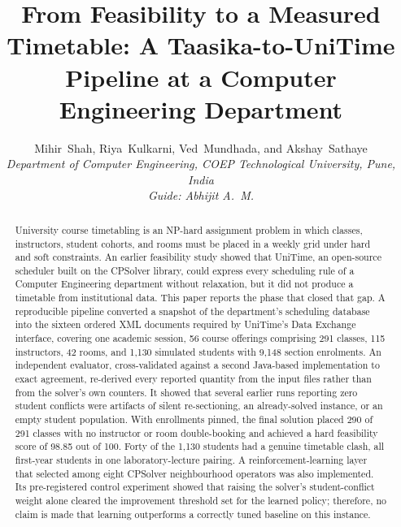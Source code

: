 \documentclass[journal]{IEEEtran}
\begin{document}
\title{From Feasibility to a Measured Timetable: A Taasika-to-UniTime Pipeline at a Computer Engineering Department}

\author{Mihir~Shah, Riya~Kulkarni, Ved~Mundhada, and Akshay~Sathaye\\
\textit{Department of Computer Engineering, COEP Technological University, Pune, India}\\
\textit{Guide: Abhijit A.\ M.}}


\maketitle

\begin{abstract}
University course timetabling is an NP-hard assignment problem in which classes, instructors, student cohorts, and rooms must be placed in a weekly grid under hard and soft constraints. An earlier feasibility study showed that UniTime, an open-source scheduler built on the CPSolver library, could express every scheduling rule of a Computer Engineering department without relaxation, but it did not produce a timetable from institutional data. This paper reports the phase that closed that gap. A reproducible pipeline converted a snapshot of the department’s scheduling database into the sixteen ordered XML documents required by UniTime’s Data Exchange interface, covering one academic session, 56 course offerings comprising 291 classes, 115 instructors, 42 rooms, and 1,130 simulated students with 9,148 section enrolments. An independent evaluator, cross-validated against a second Java-based implementation to exact agreement, re-derived every reported quantity from the input files rather than from the solver’s own counters. It showed that several earlier runs reporting zero student conflicts were artifacts of silent re-sectioning, an already-solved instance, or an empty student population. With enrollments pinned, the final solution placed 290 of 291 classes with no instructor or room double-booking and achieved a hard feasibility score of 98.85 out of 100. Forty of the 1,130 students had a genuine timetable clash, all first-year students in one laboratory-lecture pairing. A reinforcement-learning layer that selected among eight CPSolver neighbourhood operators was also implemented. Its pre-registered control experiment showed that raising the solver’s student-conflict weight alone cleared the improvement threshold set for the learned policy; therefore, no claim is made that learning outperforms a correctly tuned baseline on this instance.
\end{abstract}
\end{document}
